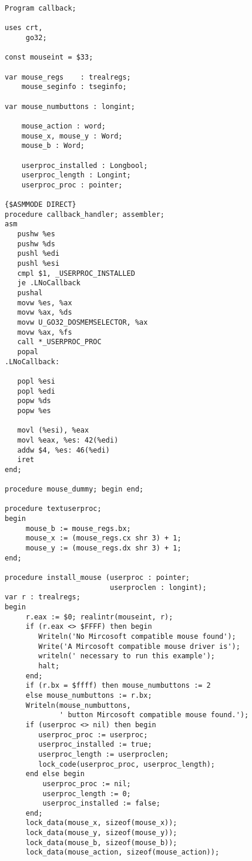 \begin{FPCList}
\item[Example]
\begin{verbatim}
Program callback;

uses crt,
     go32;

const mouseint = $33;          

var mouse_regs    : trealregs;
    mouse_seginfo : tseginfo;

var mouse_numbuttons : longint;

    mouse_action : word;
    mouse_x, mouse_y : Word;
    mouse_b : Word;

    userproc_installed : Longbool;
    userproc_length : Longint;
    userproc_proc : pointer;

{$ASMMODE DIRECT}
procedure callback_handler; assembler;
asm
   pushw %es
   pushw %ds
   pushl %edi
   pushl %esi
   cmpl $1, _USERPROC_INSTALLED
   je .LNoCallback
   pushal
   movw %es, %ax 
   movw %ax, %ds
   movw U_GO32_DOSMEMSELECTOR, %ax
   movw %ax, %fs  
   call *_USERPROC_PROC
   popal
.LNoCallback:

   popl %esi
   popl %edi
   popw %ds
   popw %es

   movl (%esi), %eax
   movl %eax, %es: 42(%edi) 
   addw $4, %es: 46(%edi)
   iret
end;

procedure mouse_dummy; begin end;

procedure textuserproc;
begin
     mouse_b := mouse_regs.bx;
     mouse_x := (mouse_regs.cx shr 3) + 1;
     mouse_y := (mouse_regs.dx shr 3) + 1;
end;

procedure install_mouse (userproc : pointer; 
                         userproclen : longint);
var r : trealregs;
begin
     r.eax := $0; realintr(mouseint, r);
     if (r.eax <> $FFFF) then begin
        Writeln('No Mircosoft compatible mouse found');
        Write('A Mircosoft compatible mouse driver is');
        writeln(' necessary to run this example');
        halt;
     end;
     if (r.bx = $ffff) then mouse_numbuttons := 2
     else mouse_numbuttons := r.bx;
     Writeln(mouse_numbuttons, 
             ' button Mircosoft compatible mouse found.');
     if (userproc <> nil) then begin
        userproc_proc := userproc;
        userproc_installed := true;
        userproc_length := userproclen;
        lock_code(userproc_proc, userproc_length);
     end else begin
         userproc_proc := nil;
         userproc_length := 0;
         userproc_installed := false;
     end;
     lock_data(mouse_x, sizeof(mouse_x));
     lock_data(mouse_y, sizeof(mouse_y));
     lock_data(mouse_b, sizeof(mouse_b));
     lock_data(mouse_action, sizeof(mouse_action));


\end{verbatim}
\end{FPCList}

